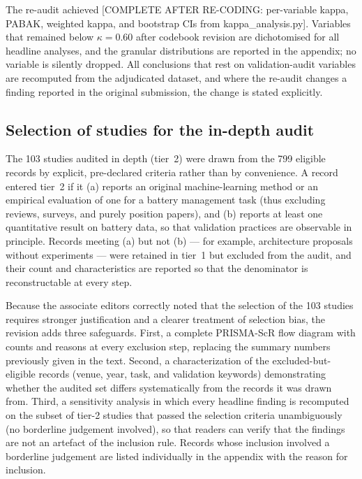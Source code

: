 The re-audit achieved [COMPLETE AFTER RE-CODING: per-variable kappa,
PABAK, weighted kappa, and bootstrap CIs from kappa\_analysis.py].
Variables that remained below $\kappa = 0.60$ after codebook revision
are dichotomised for all headline analyses, and the granular
distributions are reported in the appendix; no variable is silently
dropped. All conclusions that rest on validation-audit variables are
recomputed from the adjudicated dataset, and where the re-audit changes
a finding reported in the original submission, the change is stated
explicitly.

\subsection{Selection of studies for the in-depth audit}

The 103 studies audited in depth (tier~2) were drawn from the 799
eligible records by explicit, pre-declared criteria rather than by
convenience. A record entered tier~2 if it (a) reports an original
machine-learning method or an empirical evaluation of one for a battery
management task (thus excluding reviews, surveys, and purely
position papers), and (b) reports at least one quantitative result on
battery data, so that validation practices are observable in principle.
Records meeting (a) but not (b) --- for example, architecture proposals
without experiments --- were retained in tier~1 but excluded from the
audit, and their count and characteristics are reported so that the
denominator is reconstructable at every step.

Because the associate editors correctly noted that the selection of the
103 studies requires stronger justification and a clearer treatment of
selection bias, the revision adds three safeguards. First, a complete
PRISMA-ScR flow diagram with counts and reasons at every exclusion
step, replacing the summary numbers previously given in the text.
Second, a characterization of the excluded-but-eligible records (venue,
year, task, and validation keywords) demonstrating whether the audited
set differs systematically from the records it was drawn from.
Third, a sensitivity analysis in which every headline finding is
recomputed on the subset of tier-2 studies that passed the selection
criteria unambiguously (no borderline judgement involved), so that
readers can verify that the findings are not an artefact of the
inclusion rule. Records whose inclusion involved a borderline judgement
are listed individually in the appendix with the reason for inclusion.

